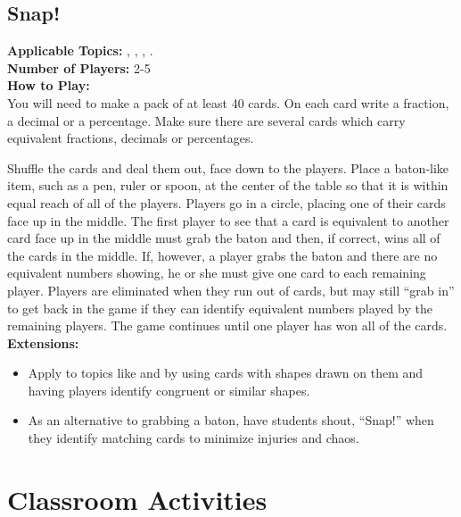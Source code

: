 	\subsection{Snap!} \label{snap}
	\textbf{Applicable Topics:} , , , .\\
	\textbf{Number of Players:} 2-5\\
	
	\noindent \textbf{How to Play:}\\
		You will need to make a pack of at least 40 cards. On each card write a fraction, a decimal or a percentage. Make sure there are several cards which carry equivalent fractions, decimals or percentages.
		
		Shuffle the cards and deal them out, face down to the players. Place a baton-like item, such as a pen, ruler or spoon, at the center of the table so that it is within equal reach of all of the players. Players go in a circle, placing one of their cards face up in the middle. The first player to see that a card is equivalent to another card face up in the middle must grab the baton and then, if correct, wins all of the cards in the middle. If, however, a player grabs the baton and there are no equivalent numbers showing, he or she must give one card to each remaining player. Players are eliminated when they run out of cards, but may still ``grab in'' to get back in the game if they can identify equivalent numbers played by the remaining players. The game continues until one player has won all of the cards.\\
		
		\noindent \textbf{Extensions:}
		\begin{itemize}
		\item Apply to topics like  and  by using cards with shapes drawn on them and having players identify congruent or similar shapes.
		\item As an alternative to grabbing a baton, have students shout, ``Snap!'' when they identify matching cards to minimize injuries and chaos.
		\end{itemize}
	
	
	
	
	
\section{Classroom Activities}	\label{classacts}
	
